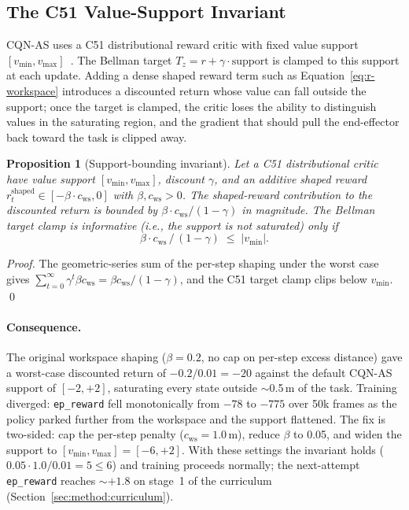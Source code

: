 \documentclass[11pt,a4paper]{report}
\newtheorem{proposition}[theorem]{Proposition}
\newcommand{\cqnas}{CQN-AS}
\begin{document}
\subsection{The C51 Value-Support Invariant}
\label{sec:method:lagrangian:support}

\cqnas{} uses a C51 distributional reward critic with fixed value
support $[v_{\min}, v_{\max}]$~\cite{bellemare2017c51}. The Bellman
target $T_z = r + \gamma \cdot \mathrm{support}$ is clamped to this
support at each update. Adding a dense shaped reward term such as
Equation~\ref{eq:r-workspace} introduces a discounted return whose
value can fall outside the support; once the target is clamped, the
critic loses the ability to distinguish values in the saturating
region, and the gradient that should pull the end-effector back
toward the task is clipped away.

\begin{proposition}[Support-bounding invariant]
\label{lem:support-bound}
Let a C51 distributional critic have value support
$[v_{\min}, v_{\max}]$, discount $\gamma$, and an additive shaped
reward $r^{\mathrm{shaped}}_t \in [-\beta \cdot c_{\mathrm{ws}}, 0]$
with $\beta, c_{\mathrm{ws}} > 0$. The shaped-reward contribution
to the discounted return is bounded by
$\beta \cdot c_{\mathrm{ws}} / (1 - \gamma)$ in magnitude. The
Bellman target clamp is informative (i.e., the support is not
saturated) only if
\begin{equation}
  \beta \cdot c_{\mathrm{ws}} \,/\, (1-\gamma) \;\le\; |v_{\min}|.
  \label{eq:support-invariant}
\end{equation}
\end{proposition}

\begin{proof}
The geometric-series sum of the per-step shaping under the worst
case gives $\sum_{t=0}^\infty \gamma^t \beta c_{\mathrm{ws}} =
\beta c_{\mathrm{ws}} / (1-\gamma)$, and the C51 target clamp
clips below $v_{\min}$. \qed
\end{proof}

\paragraph{Consequence.}
The original workspace shaping ($\beta = 0.2$, no cap on per-step
excess distance) gave a worst-case discounted return of
$-0.2 / 0.01 = -20$ against the default \cqnas{} support of
$[-2, +2]$, saturating every state outside $\sim$0.5\,m of the
task. Training diverged: \texttt{ep\_reward} fell monotonically
from $-78$ to $-775$ over 50k frames as the policy parked further
from the workspace and the support flattened. The fix is
two-sided: cap the per-step penalty ($c_{\mathrm{ws}} = 1.0$\,m),
reduce $\beta$ to 0.05, and widen the support to
$[v_{\min}, v_{\max}] = [-6, +2]$. With these settings the
invariant holds ($0.05 \cdot 1.0 / 0.01 = 5 \le 6$) and training
proceeds normally; the next-attempt \texttt{ep\_reward} reaches
$\sim +1.8$ on stage~1 of the curriculum
(Section~\ref{sec:method:curriculum}).
\end{document}
